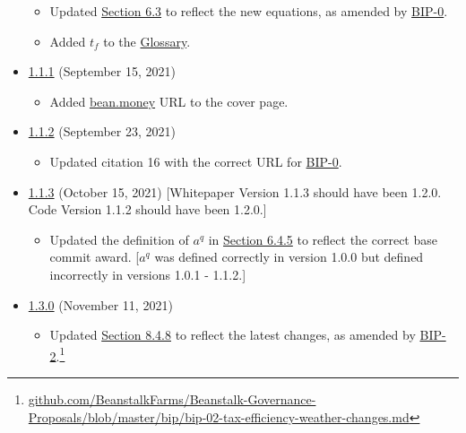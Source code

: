 \documentclass[class=article, crop=false]{standalone}
\begin{document}
\begin{itemize}[topsep=0pt, itemsep=3pt,leftmargin=16pt]
\begin{itemize}
        \item Updated \hyperlink{subsection.6.3}{Section 6.3} to reflect the new  equations, as amended by \href{https://github.com/BeanstalkFarms/Beanstalk-Governance-Proposals/blob/master/bip/bip-00-silo-refactor.md}{BIP-0}.
        \item Added $t_f$ to the \hyperlink{subsection.12.2}{Glossary}.
    \end{itemize}
    \item \href{https://github.com/BeanstalkFarms/Beanstalk/blob/master/version-history/beanstalk1_1_1.pdf}{1.1.1} (September 15, 2021)
    \begin{itemize}
        \item Added \href{https://bean.money/}{bean.money} URL to the cover page.
    \end{itemize}
    \item \href{https://github.com/BeanstalkFarms/Beanstalk/blob/master/version-history/beanstalk1_1_2.pdf}{1.1.2} (September 23, 2021)
    \begin{itemize}
        \item Updated citation 16 with the correct URL for \href{https://github.com/BeanstalkFarms/Beanstalk-Governance-Proposals/blob/master/bip/bip-00-silo-refactor.md}{BIP-0}.
    \end{itemize}
    \item \href{https://github.com/BeanstalkFarms/Beanstalk/blob/master/version-history/beanstalk1_1_3.pdf}{1.1.3} (October 15, 2021) [Whitepaper Version 1.1.3 should have been 1.2.0. Code Version 1.1.2 should have been 1.2.0.]
    \begin{itemize}
        \item Updated the definition of $a^q$ in \hyperlink{subsubsection.6.4.5}{Section 6.4.5} to reflect the correct base commit award. [$a^q$ was defined correctly in version 1.0.0 but defined incorrectly in versions 1.0.1 - 1.1.2.]
    \end{itemize}
    \item \href{https://github.com/BeanstalkFarms/Beanstalk/blob/master/version-history/beanstalk1_3_0.pdf}{1.3.0} (November 11, 2021)
    \begin{itemize}
        \item Updated \hyperlink{subsubsection.8.4.8}{Section 8.4.8} to reflect the latest  changes, as amended by \href{https://github.com/BeanstalkFarms/Beanstalk-Governance-Proposals/blob/master/bip/bip-02-tax-efficiency-weather-changes.md}{BIP-2}.\footnote{\href{https://github.com/BeanstalkFarms/Beanstalk-Governance-Proposals/blob/master/bip/bip-02-tax-efficiency-weather-changes.md}{github.com/BeanstalkFarms/Beanstalk-Governance-Proposals/blob/master/bip/bip-02-tax-efficiency-weather-changes.md}}

\end{itemize}
\end{itemize}
\end{document}
